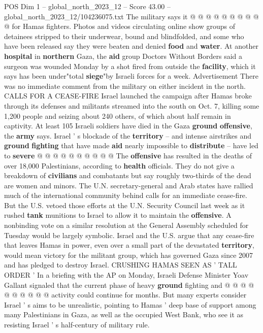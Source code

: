 \begin{textsample}{POS Dim 1 – global\_north\_2023\_12 – Score 43.00 – global\_north\_2023\_12/104236075.txt}
The military says it @ @ @ @ @ @ @ @ @ @ for Hamas fighters.
Photos and videos circulating online show groups of detainees stripped to their underwear, bound and blindfolded, and some who have been released say they were beaten and denied \textbf{food} and \textbf{water}.
At another \textbf{hospital} in \textbf{northern} Gaza, the \textbf{aid} group Doctors Without Borders said a surgeon was wounded Monday by a shot fired from outside the \textbf{facility}, which it says has been under"total \textbf{siege}"by Israeli forces for a week.
Advertisement There was no immediate comment from the military on either incident in the north.
CALLS FOR A CEASE-FIRE Israel launched the campaign after Hamas broke through its defenses and militants streamed into the south on Oct. 7, killing some 1,200 people and seizing about 240 others, of which about half remain in captivity.
At least 105 Israeli soldiers have died in the Gaza \textbf{ground} \textbf{offensive}, the \textbf{army} says.
Israel ' s blockade of the \textbf{territory} -- and intense airstrikes and \textbf{ground} \textbf{fighting} that have made \textbf{aid} nearly impossible to \textbf{distribute} -- have led to \textbf{severe} @ @ @ @ @ @ @ @ @ @ The \textbf{offensive} has resulted in the deaths of over 18,000 Palestinians, according to \textbf{health} officials.
They do not give a breakdown of \textbf{civilians} and combatants but say roughly two-thirds of the dead are women and minors.
The U.N. secretary-general and Arab states have rallied much of the international community behind calls for an immediate cease-fire.
But the U.S. vetoed those efforts at the U.N.
Security Council last week as it rushed \textbf{tank} munitions to Israel to allow it to maintain the \textbf{offensive}.
A nonbinding vote on a similar resolution at the General Assembly scheduled for Tuesday would be largely symbolic.
Israel and the U.S. argue that any cease-fire that leaves Hamas in power, even over a small part of the devastated \textbf{territory}, would mean victory for the militant group, which has governed Gaza since 2007 and has pledged to destroy Israel.
CRUSHING HAMAS SEEN AS ' TALL ORDER ' In a briefing with the AP on Monday, Israeli Defense Minister Yoav Gallant signaled that the current phase of heavy \textbf{ground} fighting and @ @ @ @ @ @ @ @ @ @ activity could continue for months.
But many experts consider Israel ' s aims to be unrealistic, pointing to Hamas ' deep base of support among many Palestinians in Gaza, as well as the occupied West Bank, who see it as resisting Israel ' s half-century of military rule.

\end{textsample}
